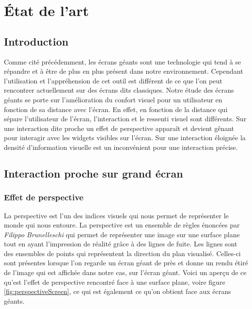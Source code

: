 \chapter{État de l’art}

\section{Introduction}

Comme cité précédemment, les écrans géants sont une technologie qui tend à se répandre et à être de plus en plus présent dans notre environnement. Cependant l'utilisation et l'appréhension de cet outil est différent de ce que l'on peut rencontrer actuellement sur des écrans dits classiques. Notre étude des écrans géants se porte sur l'amélioration du confort visuel pour un utilisateur en fonction de sa distance avec l'écran. En effet, en fonction de la distance qui sépare l'utilisateur de l'écran, l'interaction et le ressenti visuel sont différents. Sur une interaction dite proche un effet de perspective apparaît et devient gênant pour interagir avec les widgets visibles sur l'écran. Sur une interaction éloignée la densité d'information visuelle est un inconvénient pour une interaction précise.

\section{Interaction proche sur grand écran}

\subsection{Effet de perspective}

La perspective est l'un des indices visuels qui nous permet de représenter le monde qui nous entoure. La perspective est un ensemble de règles énoncées par \textit{Filippo Brunelleschi} qui permet de représenter une image sur une surface plane tout en ayant l'impression de réalité grâce à des lignes de fuite. Les lignes sont des ensembles de points qui représentent la direction du plan visualisé. Celles-ci sont présentes lorsque l'on regarde un écran géant de près et donne un rendu étiré de l'image qui est affichée dans notre cas, sur l'écran géant. Voici un aperçu de ce qu'est l'effet de perspective rencontré face à une surface plane, voire figure \ref{fig:perspectiveScreen}, ce qui est également ce qu'on obtient face aux écrans géants.

